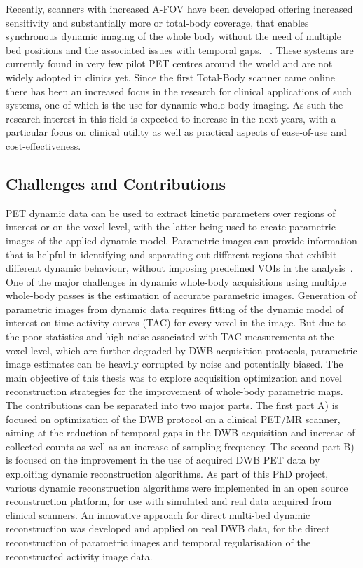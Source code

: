 Recently, scanners with increased A-FOV have been developed offering increased sensitivity and substantially more or total-body coverage, that enables synchronous dynamic imaging of the whole body without the need of multiple bed positions and the associated issues with temporal gaps. ~\cite{Karp2020,Siegel2020, Cherry2018}.
These systems are currently found in very few pilot PET centres around the world and are not widely adopted in clinics yet. Since the first Total-Body scanner came online there has been an increased focus in the research for clinical applications of such systems, one of which is the use for dynamic whole-body imaging. As such the research interest in this field is expected to increase in the next years, with a particular focus on clinical utility as well as practical aspects of ease-of-use and cost-effectiveness.

\subsection*{Challenges and Contributions}
PET dynamic data can be used to extract kinetic parameters over regions of interest or on the voxel level, with the latter being used to create parametric images of the applied dynamic model.
Parametric images can provide information that is helpful in identifying and separating out different regions that exhibit different dynamic behaviour, without imposing predefined VOIs in the analysis~\cite{Gallezot2019}.  
One of the major challenges in dynamic whole-body acquisitions using multiple whole-body passes is the estimation of accurate parametric images. Generation of parametric images from dynamic data requires fitting of the dynamic model of interest on time activity curves (TAC) for every voxel in the image. But due to the poor statistics and high noise associated with TAC measurements at the voxel level, which are further degraded by DWB acquisition protocols, parametric image estimates can be heavily corrupted by noise and potentially biased. 
The main objective of this thesis was to explore acquisition optimization and novel reconstruction strategies for the improvement of whole-body parametric maps. 
The contributions can be separated into two major parts. The first part A) is focused on optimization of the DWB protocol on a clinical PET/MR scanner, aiming at the reduction of temporal gaps in the DWB acquisition and increase of collected counts as well as an increase of sampling frequency. The second part B) is focused on the improvement in the use of acquired DWB PET data by exploiting dynamic reconstruction algorithms. As part of this PhD project, various dynamic reconstruction algorithms were implemented in an open source reconstruction platform, for use with simulated and real data acquired from clinical scanners. An innovative approach for direct multi-bed dynamic reconstruction was developed and applied on real DWB data, for the direct reconstruction of parametric images and temporal regularisation of the reconstructed activity image data.

